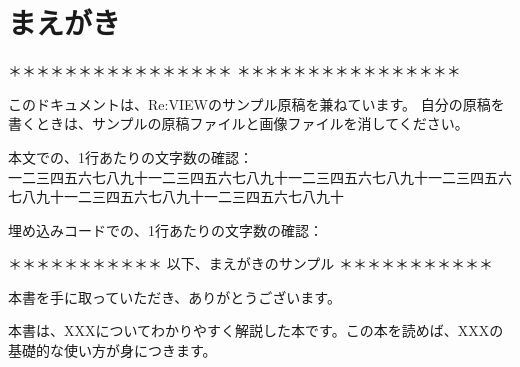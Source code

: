 \chapter{まえがき}
\label{chap:chap00-preface}

\begin{center}
＊＊＊＊＊＊＊＊＊＊＊＊＊＊＊＊  ＊＊＊＊＊＊＊＊＊＊＊＊＊＊＊＊
\end{center}

このドキュメントは、Re:VIEWのサンプル原稿を兼ねています。
自分の原稿を書くときは、サンプルの原稿ファイルと画像ファイルを消してください。

\begin{starterterminal}\end{starterterminal}

本文での、1行あたりの文字数の確認：\\{}
一二三四五六七八九十一二三四五六七八九十一二三四五六七八九十一二三四五六七八九十一二三四五六七八九十一二三四五六七八九十

埋め込みコードでの、1行あたりの文字数の確認：

\begin{starterprogram}\end{starterprogram}

\begin{center}
＊＊＊＊＊＊＊＊＊＊＊ 以下、まえがきのサンプル ＊＊＊＊＊＊＊＊＊＊＊\\{}
\end{center}

本書を手に取っていただき、ありがとうございます。

本書は、XXXについてわかりやすく解説した本です。この本を読めば、XXXの基礎的な使い方が身につきます。

